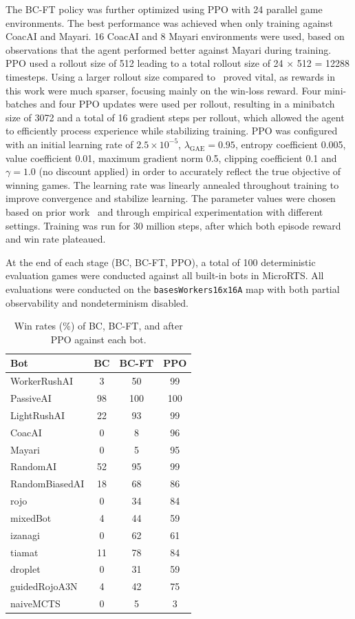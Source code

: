 \documentclass[10pt,twocolumn,letterpaper]{article}
\begin{document}
The BC-FT policy was further optimized using PPO with 24 parallel game environments. The best performance was achieved when only training against CoacAI and Mayari. 16 CoacAI and 8 Mayari environments were used, based on observations that the agent performed better against Mayari during training. PPO used a rollout size of 512 leading to a total rollout size of 24 $\times$ 512 = 12288 timesteps. Using a larger rollout size compared to~\cite{huang2021gym} proved vital, as rewards in this work were much sparser, focusing mainly on the win-loss reward. Four mini-batches and four PPO updates were used per rollout, resulting in a minibatch size of 3072 and a total of 16 gradient steps per rollout, which allowed the agent to efficiently process experience while stabilizing training. PPO was configured with an initial learning rate of \(2.5\times 10^{-5}\),  \(\lambda_{\mathrm{GAE}}=0.95\), entropy coefficient 0.005, value coefficient 0.01, maximum gradient norm 0.5, clipping coefficient 0.1 and \(\gamma=1.0\) (no discount applied) in order to accurately reflect the true objective of winning games. The learning rate was linearly annealed throughout training to improve convergence and stabilize learning. The parameter values were chosen based on prior work~\cite{goodfriend2024raisocketai, vinyals2019sc2} and through empirical experimentation with different settings. Training was run for 30 million steps, after which both episode reward and win rate plateaued.

At the end of each stage (BC, BC-FT, PPO), a total of 100 deterministic evaluation games were conducted against all built-in bots in MicroRTS. All evaluations were conducted on the \texttt{basesWorkers16x16A} map with both partial observability and nondeterminism disabled.

\begin{table}[ht]
\centering
\caption{Win rates (\%) of BC, BC-FT, and after PPO against each bot.}
\label{tab:winrates_all}
\begin{tabular}{lccc}
\hline
\textbf{Bot} & \textbf{BC} & \textbf{BC-FT} & \textbf{PPO} \\
\hline
WorkerRushAI     & 3 & 50 & 99 \\
PassiveAI        & 98& 100& 100 \\
LightRushAI      & 22 & 93 & 99 \\
CoacAI           & 0 & 8 & 96 \\
Mayari           & 0 & 5 & 95 \\
RandomAI         & 52 & 95 & 99\\
RandomBiasedAI   & 18 & 68 & 86\\
rojo             & 0 & 34& 84 \\
mixedBot         & 4 & 44 & 59 \\
izanagi          & 0& 62& 61\\
tiamat           & 11 & 78& 84 \\
droplet          & 0& 31& 59\\
guidedRojoA3N    & 4 & 42& 75 \\
naiveMCTS      & 0 & 5& 3 \\
\hline
\end{tabular}
\end{table}
\end{document}
